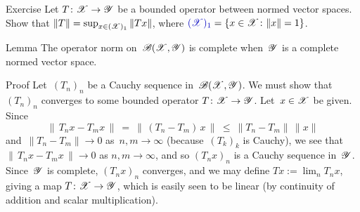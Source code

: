 \documentclass[a]{subfiles}
\begin{document}
\begin{parsec}[hilb]
\begin{point}{Exercise}
Let $T\colon \mathscr{X}\to\mathscr{Y}$
be a bounded operator between normed vector spaces.
Show that $\|T\|=\sup_{x\in (\mathscr{X})_1} \|Tx\|$,
where $\Define{(\scrX)_1}=\{x\in \scrX\colon \|x\|=1\}$.
\end{point}
\begin{point}{Lemma}%
The operator norm on~$\mathscr{B}(\mathscr{X},\mathscr{Y})$ is complete
when~$\mathscr{Y}$ is a complete normed vector space.
\begin{point}{Proof}%
Let~$(T_n)_n$ be a Cauchy sequence in~$\mathscr{B}(\mathscr{X},\mathscr{Y})$.
We must show that~$(T_n)_n$ converges to some
bounded operator $T\colon \mathscr{X}\to\mathscr{Y}$.
Let~$x\in \mathscr{X}$ be given.
Since 
\begin{equation*}
\|\,T_nx - T_mx\,\|\ =\ \|\,(T_n-T_m)\,x\,\|\ \leq\  \|T_n-T_m\|\,\|x\|
\end{equation*}
and~$\|T_n-T_m\|\to 0$ as~$n,m\to \infty$ 
(because~$(T_k)_k$ is Cauchy),
we see that $\|\,T_nx-T_mx\,\|\to 0$ as $n,m\to \infty$,
and so $(T_nx)_n$ is a Cauchy sequence in~$\mathscr{Y}$.
Since~$\mathscr{Y}$ is complete,
 $(T_nx)_n$ converges,
and  we may define $Tx:=\lim_n T_nx$,
giving a map $T\colon \mathscr{X}\to \mathscr{Y}$,
which is easily seen to be linear
(by continuity of addition and scalar multiplication).


\end{point}
\end{point}
\end{parsec}
\end{document}
